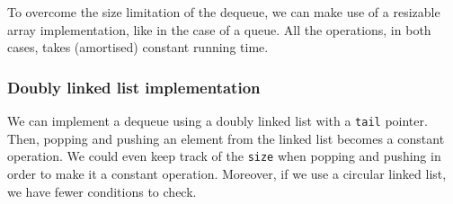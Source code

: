 \documentclass[a4paper, openany]{memoir}
\begin{document}
\noindent To overcome the size limitation of the dequeue, we can make use of a resizable array implementation, like in the case of a queue. All the operations, in both cases, takes (amortised) constant running time.

\subsubsection{Doubly linked list implementation}
We can implement a dequeue using a doubly linked list with a \texttt{tail} pointer. Then, popping and pushing an element from the linked list becomes a constant operation. We could even keep track of the \texttt{size} when popping and pushing in order to make it a constant operation. Moreover, if we use a circular linked list, we have fewer conditions to check.
\end{document}
